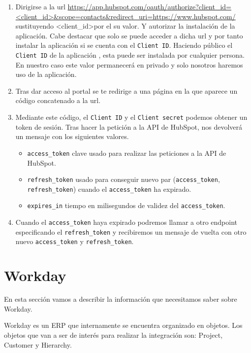 \begin{enumerate}
	\item Dirigirse a la url \url{https://app.hubspot.com/oauth/authorize?client_id=<client_id>&scope=contacts&redirect_uri=https://www.hubspot.com/}
		\\ 
		sustituyendo \textless client\_id\textgreater por el su valor. Y autorizar la instalación de la aplicación. Cabe destacar que solo se puede acceder a dicha url  y por tanto instalar la aplicación si se cuenta con el \verb|Client ID|.
		Haciendo público el \verb|Client ID| de la aplicación , esta puede ser instalada por cualquier persona. En nuestro caso este valor permanecerá en privado y solo nosotros haremos uso de la aplicación.
		
	\item Tras dar acceso al portal se te redirige a una página en la que aparece un código concatenado a la url.
	\item Mediante este código, el \verb|Client ID| y el \verb|Client secret| podemos obtener un token de sesión.
	Tras hacer la petición a la API de HubSpot, nos devolverá un mensaje con los siguientes valores.
		\begin{itemize}
			\item \verb|access_token| clave usado para realizar las peticiones a la API de HubSpot.
			\item \verb|refresh_token| usado para conseguir nuevo par (\verb|access_token|, \verb|refresh_token|) cuando el \verb|access_token| ha expirado.
			\item \verb|expires_in| tiempo en milisegundos de validez del \verb|access_token|.
		\end{itemize}
	\item Cuando el \verb|access_token| haya expirado podremos llamar a otro endpoint especificando el \verb|refresh_token| y recibiremos un mensaje de vuelta con otro nuevo \verb|access_token| y \verb|refresh_token|.
\end{enumerate}



\section{Workday}

En esta sección vamos a describir la información que necesitamos saber sobre Workday.

Workday es un ERP que internamente se encuentra organizado en objetos. Los objetos que van a ser de interés para realizar la integración son:
Project, Customer y Hierarchy.

